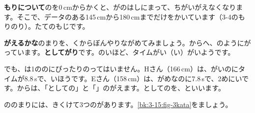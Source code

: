 \textbf{もりについて}\quad {}のを0\,cmからかくと、がのはしにまって、ちがいがえなくなります。そこで、データのある145\,cmから180\,cmまでだけをかいています（3-4のもりのり）。たてのもじです。

\textbf{がえるかな}\quad {}のまりを、くからぼんやりながめてみましょう。からへ、のようにがっています。\textbf{としてがり}です。のいほど、タイムがい（い）がいようです。

でも、は1ののにぴったりのってはいません。Hさん（166\,cm）は、がいのにタイムが8.8\,sで、いほうです。Eさん（158\,cm）は、がめなのに7.8\,sで、2めにいです。からは、「としての」と「」のがえます。としてのを、\textbf{}といいます。


\leavevmode\label{bk:3-15:sokan}ののまりには、きくけて3つのがあります。\ref{bk:3-15:fig-3kata}をましょう。

